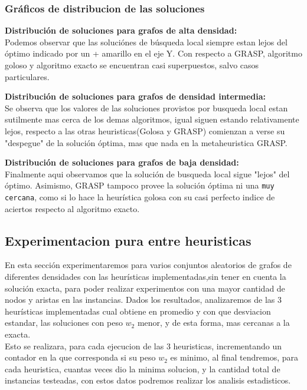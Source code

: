 \vspace{0.5cm}

\subsubsection{Gr\'aficos de distribucion de las soluciones}
\vspace{0.5cm}
\textbf{Distribuci\'on de soluciones para grafos de alta densidad:}\\
Podemos observar que las soluci\'ones de b\'usqueda local siempre estan lejos del \'optimo indicado por un + amarillo en el eje Y. Con respecto a GRASP, algoritmo goloso y algoritmo exacto se encuentran casi superpuestos, salvo casos particulares.

\vspace{0.5cm}
\textbf{Distribuci\'on de soluciones para grafos de densidad intermedia:}\\
Se observa que los valores de las soluciones provistos por busqueda local estan sutilmente mas cerca de los demas algoritmos, igual siguen estando relativamente lejos, respecto a las otras heuristicas(Golosa y GRASP) comienzan a verse su "despegue" de la soluci\'on \'optima, mas que nada en la metaheuristica GRASP.

\vspace{0.5cm}
\textbf{Distribuci\'on de soluciones para grafos de baja densidad:}\\
Finalmente aqui observamos que la soluci\'on de busqueda local sigue "lejos" del \'optimo. Asimismo, GRASP tampoco provee la soluci\'on \'optima ni una \texttt{muy cercana}, como si lo hace la heur\'istica golosa con su casi perfecto indice de aciertos respecto al algoritmo exacto.

\subsection{Experimentacion pura entre heuristicas}
En esta secci\'on experimentaremos para varios conjuntos aleatorios de grafos de diferentes densidades con las heur\'isticas implementadas,sin tener en cuenta la soluci\'on exacta, para poder realizar experimentos con una mayor cantidad de nodos y aristas en las instancias. Dados los resultados, analizaremos de las 3 heur\'isticas implementadas cual obtiene en promedio y con que desviacion estandar, las soluciones con peso $w_2$ menor, y de esta forma, mas cercanas a la exacta.\\

Esto se realizara, para cada ejecucion de las 3 heuristicas, incrementando un contador en la que corresponda si su peso $w_2$ es minimo, al final tendremos, para cada heuristica, cuantas veces dio la minima solucion, y la cantidad total de instancias testeadas, con estos datos podremos realizar los analisis estadisticos.